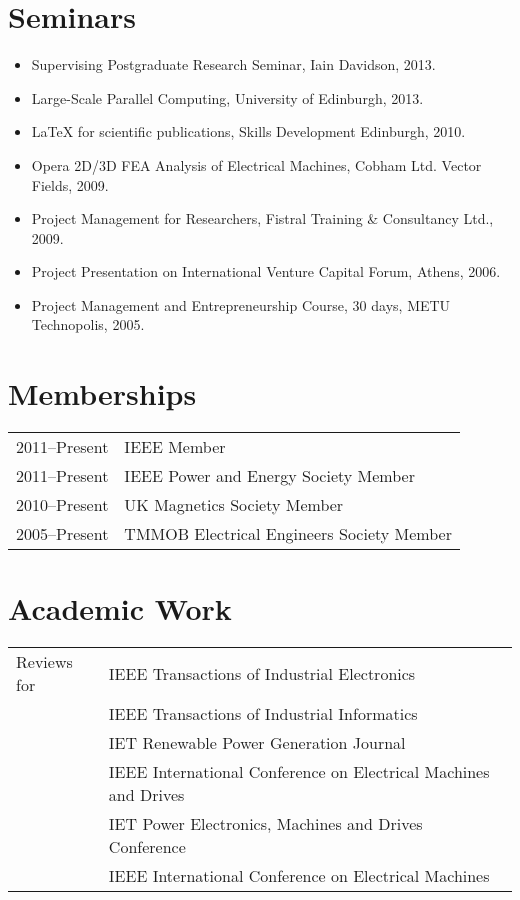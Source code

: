 \documentclass[a4paper,12pt]{article}
\begin{document}
\section{Seminars}
\begin{itemize}
\item Supervising Postgraduate Research Seminar, Iain Davidson, 2013. 
\item Large-Scale Parallel Computing, University of Edinburgh, 2013.
\item LaTeX for scientific publications, Skills Development Edinburgh, 2010.
\item Opera 2D/3D FEA Analysis of Electrical Machines, Cobham Ltd. Vector Fields, 2009.
\item Project Management for Researchers, Fistral Training \& Consultancy Ltd., 2009.
\item Project Presentation on International Venture Capital Forum, Athens, 2006.
\item Project Management and Entrepreneurship Course, 30 days, METU Technopolis, 2005.
\end{itemize}


\section{Memberships}
\begin{tabular}{ll}
2011--Present & IEEE Member \\
2011--Present & IEEE Power and Energy Society Member \\
2010--Present & UK Magnetics Society Member\\
2005--Present & TMMOB Electrical Engineers Society Member\\
\end{tabular}

\section{Academic Work}
\begin{tabular}{ll}
Reviews for & IEEE Transactions of Industrial Electronics \\
& IEEE Transactions of Industrial Informatics \\
& IET Renewable Power Generation Journal \\
& IEEE International Conference on Electrical Machines and Drives \\
& IET Power Electronics, Machines and Drives Conference \\
& IEEE International Conference on Electrical Machines\\
\end{tabular}
\end{document}

